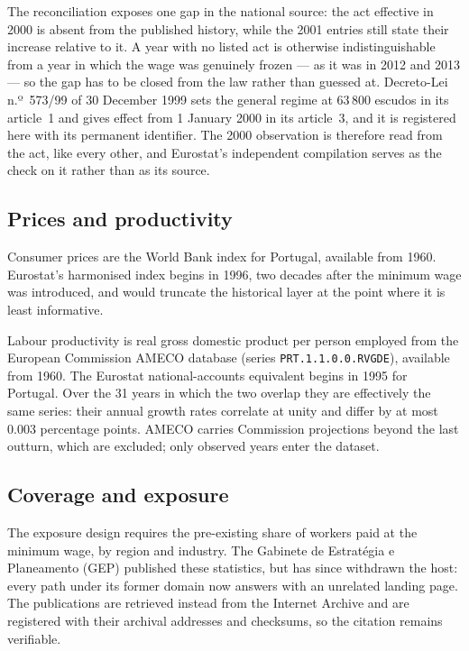 The reconciliation exposes one gap in the national source: the act effective in
2000 is absent from the published history, while the 2001 entries still state
their increase relative to it. A year with no listed act is otherwise
indistinguishable from a year in which the wage was genuinely frozen --- as it
was in 2012 and 2013 --- so the gap has to be closed from the law rather than
guessed at. Decreto-Lei n.º~573/99 of 30 December 1999 sets the general regime
at 63\,800 escudos in its article~1 and gives effect from 1 January 2000 in its
article~3, and it is registered here with its permanent identifier. The 2000
observation is therefore read from the act, like every other, and Eurostat's
independent compilation serves as the check on it rather than as its source.

\subsection{Prices and productivity}

Consumer prices are the World Bank index for Portugal, available from 1960.
Eurostat's harmonised index begins in 1996, two decades after the minimum wage
was introduced, and would truncate the historical layer at the point where it is
least informative.

Labour productivity is real gross domestic product per person employed from the
European Commission AMECO database (series \texttt{PRT.1.1.0.0.RVGDE}),
available from 1960. The Eurostat national-accounts equivalent begins in 1995
for Portugal. Over the 31 years in which the two overlap they are effectively
the same series: their annual growth rates correlate at unity and differ by at
most 0.003 percentage points. AMECO carries Commission projections beyond the
last outturn, which are excluded; only observed years enter the dataset.

\subsection{Coverage and exposure}

The exposure design requires the pre-existing share of workers paid at the
minimum wage, by region and industry. The Gabinete de Estratégia e Planeamento
(GEP) published these statistics, but has since withdrawn the host: every path
under its former domain now answers with an unrelated landing page. The
publications are retrieved instead from the Internet Archive and are registered
with their archival addresses and checksums, so the citation remains verifiable.

